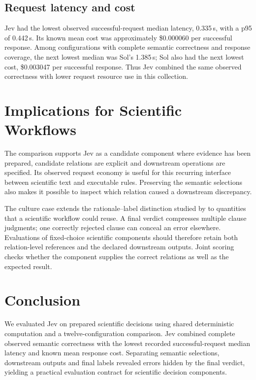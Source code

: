 \documentclass[11pt]{article}
\begin{document}
\subsection{Request latency and cost}

Jev had the lowest observed successful-request median latency, 0.335\,s, with a p95 of 0.442\,s. Its known mean cost was approximately \$0.000060 per successful response. Among configurations with complete semantic correctness and response coverage, the next lowest median was Sol's 1.385\,s; Sol also had the next lowest cost, \$0.003047 per successful response. Thus Jev combined the same observed correctness with lower request resource use in this collection.

\section{Implications for Scientific Workflows}
\label{sec:discussion}

The comparison supports Jev as a candidate component where evidence has been prepared, candidate relations are explicit and downstream operations are specified. Its observed request economy is useful for this recurring interface between scientific text and executable rules. Preserving the semantic selections also makes it possible to inspect which relation caused a downstream discrepancy.

The culture case extends the rationale--label distinction studied by \citet{ho2025table} to quantities that a scientific workflow could reuse. A final verdict compresses multiple clause judgments; one correctly rejected clause can conceal an error elsewhere. Evaluations of fixed-choice scientific components should therefore retain both relation-level references and the declared downstream outputs. Joint scoring checks whether the component supplies the correct relations as well as the expected result.

\section{Conclusion}

We evaluated Jev on prepared scientific decisions using shared deterministic computation and a twelve-configuration comparison. Jev combined complete observed semantic correctness with the lowest recorded successful-request median latency and known mean response cost. Separating semantic selections, downstream outputs and final labels revealed errors hidden by the final verdict, yielding a practical evaluation contract for scientific decision components.
\end{document}
